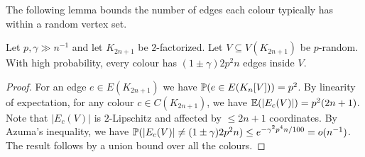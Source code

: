 The following lemma  bounds the number of edges each colour typically has within a random vertex set.
\begin{lemma}\label{Lemma_number_of_colours_inside_random_set}
Let $p,\gamma\gg n^{-1}$  and let  $K_{2n+1}$ be $2$-factorized.
Let $V\subseteq V(K_{2n+1})$  be $p$-random. With high probability, every colour has $(1\pm \gamma)2p^2n$ edges inside $V$.
\end{lemma}
\begin{proof}
For an edge $e\in E(K_{2n+1})$ we have $\P(e \in E(K_n[V]))=p^2$.
By linearity of expectation, for any colour $c\in C(K_{2n+1})$, we have $\E(|E_c(V)|)=p^2(2n+1)$. Note that $|E_c(V)|$ is $2$-Lipschitz and affected by $\leq 2n+1$ coordinates.
By Azuma's inequality, we have $\P(|E_c(V)|\neq (1\pm \gamma)2p^2n )\leq e^{-\gamma^2p^4n/100}= o(n^{-1})$.
The result follows by a union bound over all the colours.
\end{proof}



